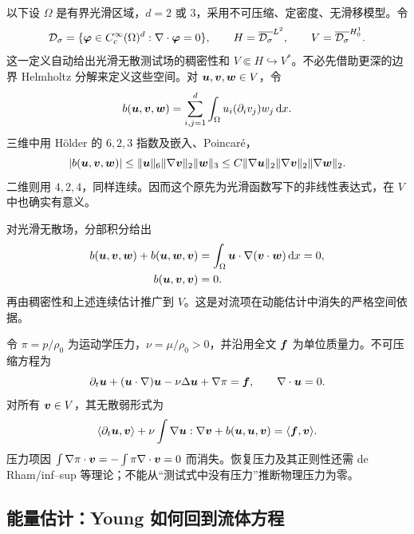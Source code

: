 以下设 $\Omega$ 是有界光滑区域，$d=2$ 或 $3$，采用不可压缩、定密度、无滑移模型。令
\[
 \mathcal D_\sigma=\{\bm{\varphi}\in C_c^\infty(\Omega)^d:
                       \nabla\cdot\bm{\varphi}=0\},\qquad
 H=\overline{\mathcal D_\sigma}^{L^2},\qquad
 V=\overline{\mathcal D_\sigma}^{H^1_0}.
\]
这一定义自动给出光滑无散测试场的稠密性和 $V\Subset H\hookrightarrow V^*$。不必先借助更深的边界 Helmholtz 分解来定义这些空间。对 $\bm{u},\bm{v},\bm{w}\in V$，令
\begin{equation}
 b(\bm{u},\bm{v},\bm{w})
 =\sum_{i,j=1}^d\int_\Omega u_i(\partial_i v_j)w_j\,\mathrm d x.
 \label{eq:sobolev-trilinear}
\end{equation}
三维中用 H\"older 的 $6,2,3$ 指数及嵌入、Poincar\'e，
\begin{equation}
 |b(\bm{u},\bm{v},\bm{w})|
 \le\|\bm{u}\|_6\|\nabla\bm{v}\|_2\|\bm{w}\|_3
 \le C\|\nabla\bm{u}\|_2\|\nabla\bm{v}\|_2\|\nabla\bm{w}\|_2.
 \label{eq:sobolev-b-bound}
\end{equation}
二维则用 $4,2,4$，同样连续。因而这个原先为光滑函数写下的非线性表达式，在 $V$ 中也确实有意义。

对光滑无散场，分部积分给出
\begin{align*}
 b(\bm{u},\bm{v},\bm{w})+b(\bm{u},\bm{w},\bm{v})
 &=\int_\Omega\bm{u}\cdot\nabla(\bm{v}\cdot\bm{w})\,\mathrm d x=0,\\
 b(\bm{u},\bm{v},\bm{v})&=0.
\end{align*}
再由稠密性和上述连续估计推广到 $V$。这是对流项在动能估计中消失的严格空间依据。

令 $\pi=p/\rho_0$ 为运动学压力，$\nu=\mu/\rho_0>0$，并沿用全文 $\bm{f}$ 为单位质量力。不可压缩方程为
\[
 \partial_t\bm{u}+(\bm{u}\cdot\nabla)\bm{u}
 -\nu\Delta\bm{u}+\nabla\pi=\bm{f},\qquad\nabla\cdot\bm{u}=0.
\]
对所有 $\bm{v}\in V$，其无散弱形式为
\begin{equation}
 \langle\partial_t\bm{u},\bm{v}\rangle
 +\nu\int\nabla\bm{u}:\nabla\bm{v}
 +b(\bm{u},\bm{u},\bm{v})=\langle\bm{f},\bm{v}\rangle.
 \label{eq:sobolev-ns-weak}
\end{equation}
压力项因 $\int\nabla\pi\cdot\bm{v}=-\int\pi\nabla\cdot\bm{v}=0$ 而消失。恢复压力及其正则性还需 de Rham/inf--sup 等理论；不能从“测试式中没有压力”推断物理压力为零。

\subsection{能量估计：Young 如何回到流体方程}

